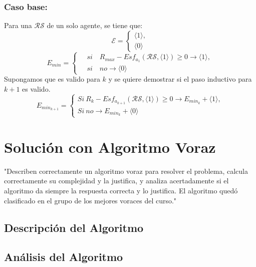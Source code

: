 \documentclass[letterpaper,10pt]{article}
\begin{document}
\subsubsection*{Caso base:}
Para una $\mathcal{R} \mathcal{S}$ de un solo agente, se tiene que:
\begin{equation}
  \mathcal{E} =   
  \begin{cases} 
    \langle 1 \rangle, \\
    \langle 0 \rangle 
  \end{cases}
\end{equation}
\begin{equation}
  E_{min} =   
  \begin{cases} 
    \quad si \quad R_{max} - Esf_{a_1}(\mathcal{R}\mathcal{S},\langle 1 \rangle ) \geqslant 0 \rightarrow \langle 1 \rangle  , \\
    \quad si \quad no \rightarrow \langle 0 \rangle  
  \end{cases}
\end{equation}
Supongamos que es valido para $k$ y se quiere demostrar si el paso inductivo para $k+1$ es valido.
\begin{equation}
  E_{min_{k+1}} =   
  \begin{cases} 
    Si ~ R_{k} -Esf_{a_{k+1}}(\mathcal{R}\mathcal{S},\langle 1 \rangle )\geqslant 0 \rightarrow E_{min_k} + \langle 1 \rangle   , \\
    Si ~ no \rightarrow E_{min_k} + \langle 0 \rangle 
  \end{cases}
\end{equation}
\section{Solución con Algoritmo Voraz}
\label{sec:algoritmo_voraz}
"Describen correctamente un algoritmo voraz para resolver el problema, calcula correctamente su complejidad y la justifica, y analiza acertadamente si el algoritmo da siempre la respuesta correcta y lo justifica. El algoritmo quedó clasificado en el grupo de los mejores voraces del curso."
\subsection{Descripción del Algoritmo}
\label{subsec:descripcion_algoritmo_voraz}
\subsection{Análisis del Algoritmo}
\label{subsec:analisis_algoritmo_voraz}
\end{document}
